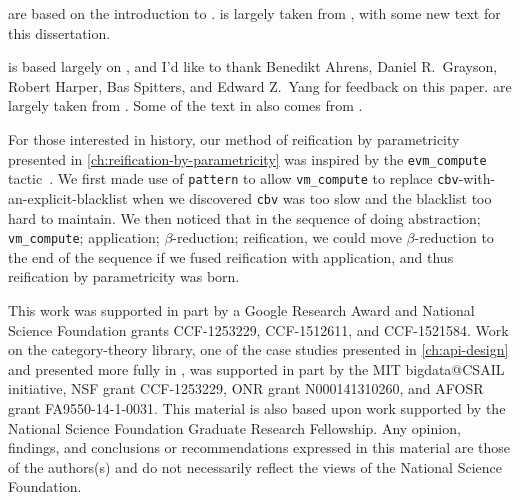  are based on the introduction to .
 is largely taken from , with some new text for this dissertation.

 is based largely on , and I'd like to thank Benedikt Ahrens, Daniel R.~Grayson, Robert Harper, Bas Spitters, and Edward Z.~Yang for feedback on this paper.
 are largely taken from .
Some of the text in  also comes from .


For those interested in history, our method of reification by parametricity presented in \autoref{ch:reification-by-parametricity} was inspired by the \texttt{evm\_compute} tactic~\cite{MirrorShardITP14}.
We first made use of \texttt{pattern} to allow \texttt{vm\_compute} to replace \texttt{cbv}-with-an-explicit-blacklist when we discovered \texttt{cbv} was too slow and the blacklist too hard to maintain.
We then noticed that in the sequence of doing abstraction; \texttt{vm\_compute}; application; $\beta$-reduction; reification, we could move $\beta$-reduction to the end of the sequence if we fused reification with application, and thus reification by parametricity was born.

This work was supported in part by a Google Research Award and National Science Foundation grants CCF-1253229, CCF-1512611, and CCF-1521584.
Work on the category-theory library, one of the case studies presented in \autoref{ch:api-design} and presented more fully in , was supported in part by the MIT bigdata@CSAIL initiative, NSF grant CCF-1253229, ONR grant N000141310260, and AFOSR grant FA9550-14-1-0031.
This material is also based upon work supported by the National Science Foundation Graduate Research Fellowship. %
%
Any opinion, findings, and conclusions or recommendations expressed in this material are those of the authors(s) and do not necessarily reflect the views of the National Science Foundation.

